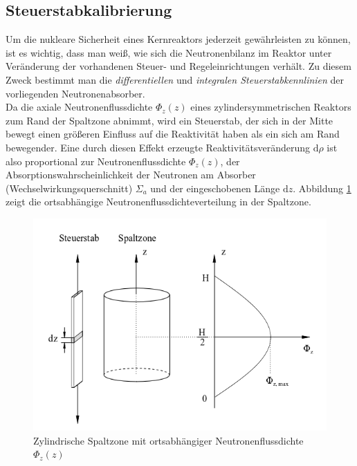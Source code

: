 	\subsection{Steuerstabkalibrierung}
	Um die nukleare Sicherheit eines Kernreaktors jederzeit gewährleisten zu können, ist es wichtig, dass man weiß, wie sich die Neutronenbilanz im Reaktor unter Veränderung der vorhandenen Steuer- und Regeleinrichtungen verhält. Zu diesem Zweck bestimmt man die \textit{differentiellen} und \textit{integralen Steuerstabkennlinien} der vorliegenden Neutronenabsorber. \\
	Da die axiale Neutronenflussdichte $\Phi_z(z)$ eines zylindersymmetrischen Reaktors zum Rand der Spaltzone abnimmt, wird ein Steuerstab, der sich in der Mitte bewegt einen größeren Einfluss auf die Reaktivität haben als ein sich am Rand bewegender. Eine durch diesen Effekt erzeugte Reaktivitätsveränderung $\mathrm{d}\rho$ ist also proportional zur Neutronenflussdichte $\Phi_z(z)$, der Absorptionswahrscheinlichkeit der Neutronen am Absorber (Wechselwirkungsquerschnitt) $\Sigma_a$ und der eingeschobenen Länge $\mathrm{d}z$. Abbildung \ref{int:NeutrFlDichte} zeigt die ortsabhängige Neutronenflussdichteverteilung in der Spaltzone.\\
		\begin{figure}[hp]
			\centering
			\captionsetup{justification=centering}
			\includegraphics[scale=0.4]{pic/NeutrFlDichte}
			\caption{Zylindrische Spaltzone mit ortsabhängiger Neutronenflussdichte $\Phi_z(z)$}
			\label{int:NeutrFlDichte}
		\end{figure}
